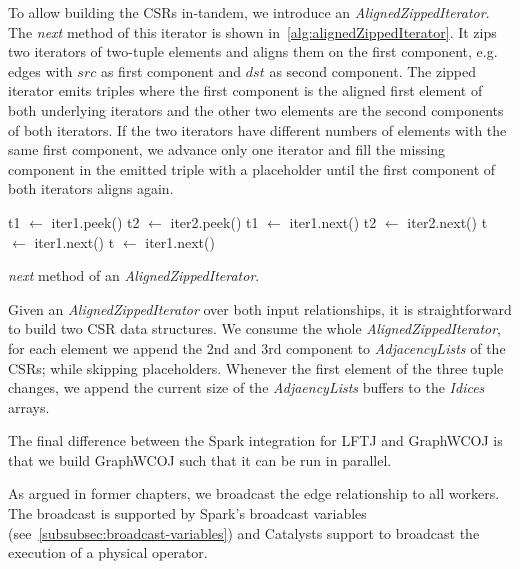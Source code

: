 To allow building the CSRs in-tandem, we introduce an \textit{AlignedZippedIterator}.
The \textit{next} method of this iterator is shown in~\cref{alg:alignedZippedIterator}.
It zips two iterators of two-tuple elements and aligns them on the first component, e.g. edges with $src$ as first component and $dst$ as
second component.
The zipped iterator emits triples where the first component is the aligned first element of both underlying iterators and the other
two elements are the second components of both iterators.
If the two iterators have different numbers of elements with the same first component, we advance only one iterator and fill the missing
component in the emitted triple with a placeholder until the first component of both iterators aligns again.

\begin{algorithm}
   {
    t1 $\leftarrow$ iter1.peek() \;
    t2 $\leftarrow$ iter2.peek() \;
     {
      t1 $\leftarrow$ iter1.next()\;
      t2 $\leftarrow $ iter2.next()\;
      \;
    }  {
      t $\leftarrow$ iter1.next()\;
       \;
    } 
  }  {
    t $\leftarrow$ iter1.next() \;
     \;
  } 
  \caption{\textit{next} method of an \textit{AlignedZippedIterator}.}
  \label{alg:alignedZippedIterator}
\end{algorithm}


Given an \textit{AlignedZippedIterator} over both input relationships, it is straightforward to build two CSR data structures.
We consume the whole \textit{AlignedZippedIterator}, for each element we append the 2nd and 3rd component to \textit{AdjacencyLists} of
the CSRs;
while skipping placeholders.
Whenever the first element of the three tuple changes, we append the current size of the \textit{AdjaencyLists} buffers to the
\textit{Idices} arrays.

The final difference between the Spark integration for \textsc{LFTJ} and GraphWCOJ is that we build GraphWCOJ such that it can
be run in parallel.

As argued in former chapters, we broadcast the edge relationship to all workers.
The broadcast is supported by Spark's broadcast variables (see~\cref{subsubsec:broadcast-variables}) and Catalysts support to broadcast
the execution of a physical operator.

